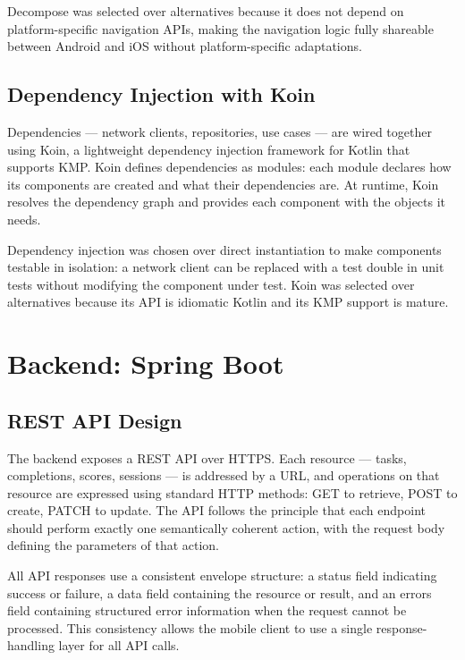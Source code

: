 Decompose was selected over alternatives because it does not depend on platform-specific navigation APIs, making the navigation logic fully shareable between Android and iOS without platform-specific adaptations.


\subsection{Dependency Injection with Koin}

Dependencies --- network clients, repositories, use cases --- are wired together using Koin, a lightweight dependency injection framework for Kotlin that supports KMP. Koin defines dependencies as modules: each module declares how its components are created and what their dependencies are. At runtime, Koin resolves the dependency graph and provides each component with the objects it needs.

Dependency injection was chosen over direct instantiation to make components testable in isolation: a network client can be replaced with a test double in unit tests without modifying the component under test. Koin was selected over alternatives because its API is idiomatic Kotlin and its KMP support is mature.


\section{Backend: Spring Boot}

\subsection{REST API Design}

The backend exposes a REST API over HTTPS. Each resource --- tasks, completions, scores, sessions --- is addressed by a URL, and operations on that resource are expressed using standard HTTP methods: GET to retrieve, POST to create, PATCH to update. The API follows the principle that each endpoint should perform exactly one semantically coherent action, with the request body defining the parameters of that action.

All API responses use a consistent envelope structure: a status field indicating success or failure, a data field containing the resource or result, and an errors field containing structured error information when the request cannot be processed. This consistency allows the mobile client to use a single response-handling layer for all API calls.

